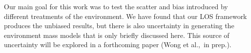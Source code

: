 Our main goal for this work was to test the scatter and bias introduced by different treatments of the environment. We have found that our LOS framework produces the unbiased results, but there is also uncertainty in generating the environment mass models that is only briefly discussed here. This source of uncertainty will be explored in a forthcoming paper (Wong et al.,~in prep.).
